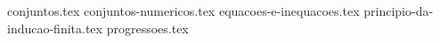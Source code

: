 \documentclass[a4paper,12pt, oneside]{book}
\begin{document}
    \nocite{*}
    \thispagestyle{empty}       %

    \printtitle                 %
        \vfill
    \printauthor                %
    \newpage
    
    \frontmatter %
    \tableofcontents
    \mainmatter %
    
    {
        \newcommand{\templatesdir}{src/esqueletos-dos-capitulos/}

        {conjuntos.tex}
        {conjuntos-numericos.tex}
        {equacoes-e-inequacoes.tex}
        {principio-da-inducao-finita.tex}
        {progressoes.tex}
    }
    
    \begin{comment}
    \chapter{Funções}
    {introducao.tex}
    {definicao.tex}
    {compostas.tex}
    {inversa.tex}
    {inj-sobr.tex}
    {formulas-e-funcoes.tex}
    {cardinalidade.tex}
    \end{comment}
\end{document}
